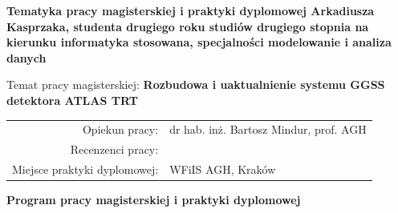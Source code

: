 \documentclass[11pt]{aghdpl}
\begin{document}

\newpage
\mbox{} 


\newpage
{}
\begin{center}
{\bf Tematyka pracy magisterskiej i praktyki dyplomowej Arkadiusza Kasprzaka,
studenta drugiego roku studiów drugiego stopnia na kierunku informatyka stosowana, specjalności modelowanie i analiza danych}\\
\end{center}

Temat pracy magisterskiej:
{\bf Rozbudowa i uaktualnienie systemu GGSS detektora ATLAS TRT}\\

\begin{tabular}{rl}

Opiekun pracy:                  & dr hab. inż. Bartosz Mindur, prof. AGH \\
Recenzenci pracy:               & \\
Miejsce praktyki dyplomowej:    & WFiIS AGH, Kraków\\
\end{tabular}

\begin{center}
{\bf Program pracy magisterskiej i praktyki dyplomowej}
\end{center}
\end{document}
